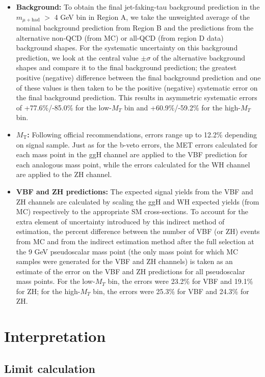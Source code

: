 \begin{itemize}
\item \textbf{Background: } To obtain the final jet-faking-tau background prediction in the $m_{\mu+\text{had}}$ $>$ 4 GeV bin in Region A, we take the unweighted average of the nominal background prediction from Region B and the predictions from the alternative non-QCD (from MC) or all-QCD (from region D data) background shapes. For the systematic uncertainty on this background prediction, we look at the central value $\pm\sigma$ of the alternative background shapes and compare it to the final background prediction; the greatest positive (negative) difference between the final background prediction and one of these values is then taken to be the positive (negative) systematic error on the final background prediction. This results in asymmetric systematic errors of +77.6\%/-85.0\% for the low-$M_{T}$ bin and +60.9\%/-59.2\% for the high-$M_{T}$ bin.
\item \textbf{$M_{\text{T}}$: } Following official recommendations, errors range up to 12.2\% depending on signal sample. Just as for the b-veto errors, the MET errors calculated for each mass point in the ggH channel are applied to the VBF prediction for each analogous mass point, while the errors calculated for the WH channel are applied to the ZH channel.
\item \textbf{VBF and ZH predictions: } The expected signal yields from the VBF and ZH channels are calculated by scaling the ggH and WH expected yields (from MC) respectively to the appropriate SM cross-sections. To account for the extra element of uncertainty introduced by this indirect method of estimation, the percent difference between the number of VBF (or ZH) events from MC and from the indirect estimation method after the full selection at the 9 GeV pseudoscalar mass point (the only mass point for which MC samples were generated for the VBF and ZH channels) is taken as an estimate of the error on the VBF and ZH predictions for all pseudoscalar mass points. For the low-$M_{T}$ bin, the errors were 23.2\% for VBF and 19.1\% for ZH; for the high-$M_{T}$ bin, the errors were 25.3\% for VBF and 24.3\% for ZH.
\end{itemize}

\section{Interpretation\label{sec:results-interpretation}}

\subsection{Limit calculation\label{sec:results-limitcalc}}

